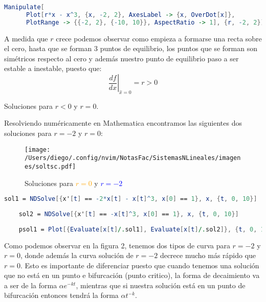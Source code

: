 \documentclass[12pt,letterpaper]{article}
\begin{document}
\begin{enumerate}
      \begin{tcolorbox}[colback=Orange!10, colframe=Orange, title=Código para graficar la figura 1]
      \begin{lstlisting}[language=Mathematica]
      Manipulate[
      Plot[r*x - x^3, {x, -2, 2}, AxesLabel -> {x, OverDot[x]}, 
      PlotRange -> {{-2, 2}, {-10, 10}}, AspectRatio -> 1], {r, -2, 2}]
      \end{lstlisting}  
      \end{tcolorbox}
                                                
    A medida que $r$ crece podemos observar como empieza a formarse una recta sobre el cero, hasta que se forman 3 puntos de equilibrio, los puntos que se forman son simétricos respecto al cero y además nuestro punto de equilibrio paso a ser estable a inestable, puesto que:
    $$
         \left. \frac{df}{dx} \right|_{\hat{x}=0} = r > 0
    $$
    
    Soluciones para $r<0$ y $r=0$.
    
    Resolviendo numéricamente en Mathematica encontramos las siguientes dos soluciones para $r=-2$ y  $r=0$:
    \begin{figure}[htpb]
      \centering
      \texttt{[image: /Users/diego/.config/nvim/NotasFac/SistemasNLineales/imagenes/soltsc.pdf]}
      \caption{Soluciones para \textcolor{Orange}{$r=0$} y \textcolor{Blue}{$r=-2$}}
    \end{figure}
    \begin{tcolorbox}[colback=Orange!10, colframe=Orange, title= Código figura 2]
    \begin{lstlisting}[language=Mathematica]
    sol1 = NDSolve[{x'[t] == -2*x[t] - x[t]^3, x[0] == 1}, x, {t, 0, 10}]
    
    sol2 = NDSolve[{x'[t] == -x[t]^3, x[0] == 1}, x, {t, 0, 10}]
    
    psol1 = Plot[{Evaluate[x[t]/.sol1], Evaluate[x[t]/.sol2]}, {t, 0, 10}, AxesLabel -> {t, x}, PlotLegends -> {r == -2, r == 0}]
    \end{lstlisting}  
    \end{tcolorbox}
    Como podemos observar en la figura 2, tenemos dos tipos de curva para $r=-2$ y $r=0$, donde además la curva solución de $r=-2$ decrece mucho más rápido que $r=0$. Esto es importante de diferenciar puesto que cuando tenemos una solución que no está en un punto e bifurcación (punto critico), la forma de decaimiento va a ser de la forma $\alpha e^{-kt}$, mientras que si nuestra solución está en un punto de bifurcación entonces tendrá la forma $\alpha t^{-k}$.


\end{enumerate}
\end{document}
